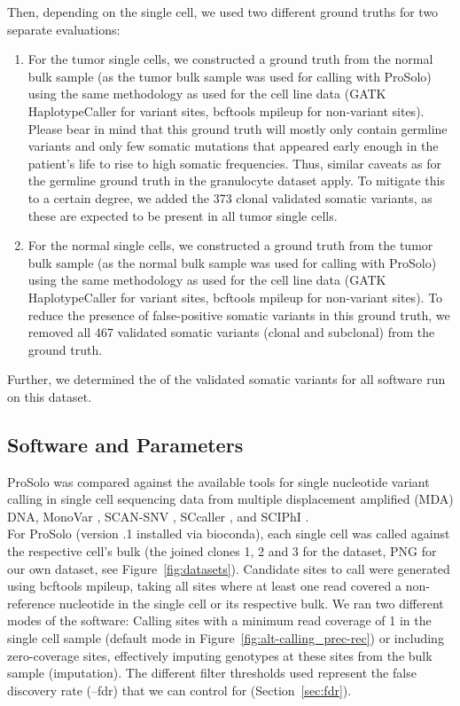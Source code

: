\documentclass[authoryear,preprint,11pt]{scrartcl}
\begin{document}
Then, depending on the single cell, we used two different ground truths for two separate evaluations:
\begin{enumerate}
    \item For the tumor single cells, we constructed a ground truth from the normal bulk sample (as the tumor bulk sample was used for calling with ProSolo) using the same methodology as used for the cell line data (GATK HaplotypeCaller for variant sites, bcftools mpileup for non-variant sites).
    Please bear in mind that this ground truth will mostly only contain germline variants and only few somatic mutations that appeared early enough in the patient's life to rise to high somatic frequencies.
    Thus, similar caveats as for the germline ground truth in the granulocyte dataset apply.
    To mitigate this to a certain degree, we added the 373 clonal validated somatic variants, as these are expected to be present in all tumor single cells.
    \item For the normal single cells, we constructed a ground truth from the tumor bulk sample (as the normal bulk sample was used for calling with ProSolo) using the same methodology as used for the cell line data (GATK HaplotypeCaller for variant sites, bcftools mpileup for non-variant sites).
    To reduce the presence of false-positive somatic variants in this ground truth, we removed all 467 validated somatic variants (clonal and subclonal) from the ground truth.
\end{enumerate}
Further, we determined the of the validated somatic variants for all software run on this dataset.


\subsection{Software and Parameters}

ProSolo was compared against the available tools for single nucleotide variant calling in single cell sequencing data from multiple displacement amplified (MDA) DNA, MonoVar \citep{zafar_monovar:_2016}, SCAN-SNV \citep{luquette_identification_2019}, SCcaller \citep{dong_accurate_2017}, and SCIPhI \citep{singer_single-cell_2018}.\\

For ProSolo (version {.1} installed via bioconda), each single cell was called against the respective cell's bulk (the joined clones 1, 2 and 3 for the \citep{dong_accurate_2017} dataset, PNG for our own dataset, see Figure~\ref{fig:datasets}).
Candidate sites to call were generated using bcftools mpileup, taking all sites where at least one read covered a non-reference nucleotide in the single cell or its respective bulk.
We ran two different modes of the software: Calling sites with a minimum read coverage of 1 in the single cell sample (default mode in Figure~\ref{fig:alt-calling_prec-rec}) or including zero-coverage sites, effectively imputing genotypes at these sites from the bulk sample (imputation).
The different filter thresholds used represent the false discovery rate ({\ttfamily --fdr}) that we can control for (Section~\ref{sec:fdr}).\\
\end{document}

